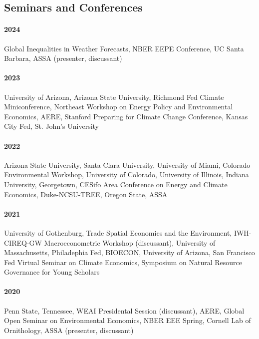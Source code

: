 \documentclass[12pt]{res} %
\begin{document}
\begin{resume}
\subsection{Seminars and Conferences}\vspace{-.1in}
\paragraph{2024} Global Inequalities in Weather Forecasts, NBER EEPE Conference, UC Santa Barbara, ASSA (presenter, discussant) \vspace{-.2in}
\paragraph{2023} University of Arizona, Arizona State University, Richmond Fed Climate Miniconference, Northeast Workshop on Energy Policy and Environmental Economics, AERE, Stanford Preparing for Climate Change Conference, Kansas City Fed, St. John's University \vspace{-.2in}
\paragraph{2022} Arizona State University, Santa Clara University, University of Miami, Colorado Environmental Workshop, University of Colorado, University of Illinois, Indiana University, Georgetown, CESifo Area Conference on Energy and Climate Economics, Duke-NCSU-TREE, Oregon State, ASSA \vspace{-.2in}
\paragraph{2021} University of Gothenburg, Trade Spatial Economics and the Environment, IWH-CIREQ-GW Macroeconometric Workshop (discussant), University of Massachusetts, Philadephia Fed, BIOECON, University of Arizona, San Francisco Fed Virtual Seminar on Climate Economics, Symposium on Natural Resource Governance for Young Scholars \vspace{-.2in}
\paragraph{2020} Penn State, Tennessee, WEAI Presidental Session (discussant), AERE, Global Open Seminar on Environmental Economics, NBER EEE Spring, Cornell Lab of Ornithology, ASSA (presenter, discussant) \vspace{-.2in}

\end{resume}
\end{document}
